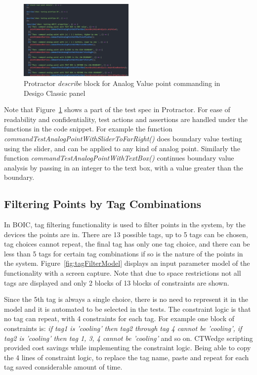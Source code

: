 \documentclass[conference]{IEEEtran}
\begin{document}
	\begin{figure}[!h]
		\includegraphics[width=0.50\textwidth,]{pointCommandingTestCode.pdf}
		\caption{Protractor \textit{describe} block for Analog Value point commanding in Desigo Classic panel}
		\label{fig:pointCommandingTestCode}
	\end{figure}

	Note that Figure~\ref{fig:pointCommandingTestCode} shows a part of the test spec in Protractor. 
	For ease of readability and confidentiality, test actions and assertions are handled under the functions in the code snippet. 
	For example the function \textit{commandTestAnalogPointWithSliderToFarRight()} does boundary value testing using the slider, and can be applied to any kind of analog point.
	Similarly the function \textit{commandTestAnalogPointWithTextBox()} continues boundary value analysis by passing in an integer to the text box, with a value greater than the boundary.



	\subsection{Filtering Points by Tag Combinations }

	In BOIC, tag filtering functionality is used to filter points in the system, by the devices the points are in.
	There are 13 possible tags, up to 5 tags can be chosen, tag choices cannot repeat, the final tag has only one tag choice, and there can be less than 5 tags for certain tag combinations if so is the nature of the points in the system.
	Figure~\ref{fig:tagFilterModel} displays an input parameter model of the functionality with a screen capture. 
	Note that due to space restrictions not all tags are displayed and only 2 blocks of 13 blocks of constraints are shown.
	
	Since the 5th tag is always a single choice, there is no need to represent it in the model and it is automated to be selected in the tests.
	The constraint logic is that no tag can repeat, with 4 constraints for each tag.
	For example one block of constraints is: \textit{if tag1 is 'cooling' then tag2 through tag 4 cannot be 'cooling', if tag2 is 'cooling' then tag 1, 3, 4 cannot be 'cooling'} and so on.
	CTWedge scripting provided cost savings while implementing the constraint logic. 
	Being able to copy the 4 lines of constraint logic, to replace the tag name, paste and repeat for each tag saved considerable amount of time.
\end{document}
